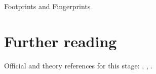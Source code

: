 \begin{ledger}{Footprints and Fingerprints}
\end{ledger}

\section{Further reading}
\label{sec:footprints:further_reading}
Official and theory references for this stage: \cite{CMS:2014pgm}, \cite{CMS:2020uim}, \cite{CMS:2013lxn}.

\begin{pitfalls}
\end{pitfalls}

\begin{exercises}
\item {}
\item {}
\end{exercises}
